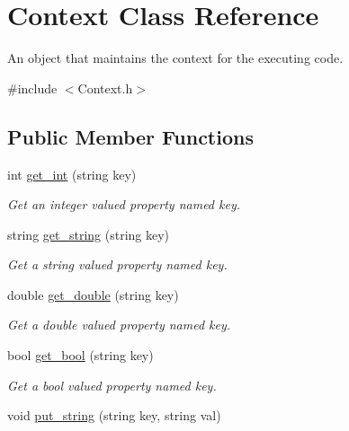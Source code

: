 \hypertarget{class_context}{
\section{Context Class Reference}
\label{class_context}
}


An object that maintains the context for the executing code.  




{\ttfamily \#include $<$Context.h$>$}

\subsection*{Public Member Functions}
\begin{DoxyCompactItemize}
\item 
int \hyperlink{class_context_a0b8f0d939e07208fe32337ace2196f24}{get\_\-int} (string key)
\begin{DoxyCompactList}\small\item\em Get an integer valued property named key. \item\end{DoxyCompactList}\item 
string \hyperlink{class_context_af0cb505ad6b35c252e69de53c193f6f4}{get\_\-string} (string key)
\begin{DoxyCompactList}\small\item\em Get a string valued property named key. \item\end{DoxyCompactList}\item 
double \hyperlink{class_context_a71717f004732933da32ba9de6db156b3}{get\_\-double} (string key)
\begin{DoxyCompactList}\small\item\em Get a double valued property named key. \item\end{DoxyCompactList}\item 
bool \hyperlink{class_context_a16045011711b9cf47ef4a54c73427f43}{get\_\-bool} (string key)
\begin{DoxyCompactList}\small\item\em Get a bool valued property named key. \item\end{DoxyCompactList}\item 
void \hyperlink{class_context_a324bb843de0425a28051ccc872f3bbe2}{put\_\-string} (string key, string val)
\end{DoxyCompactItemize}
